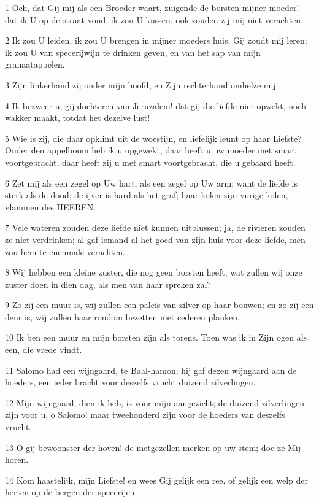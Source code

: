 \par 1 Och, dat Gij mij als een Broeder waart, zuigende de borsten mijner moeder! dat ik U op de straat vond, ik zou U kussen, ook zouden zij mij niet verachten.
\par 2 Ik zou U leiden, ik zou U brengen in mijner moeders huis, Gij zoudt mij leren; ik zou U van specerijwijn te drinken geven, en van het sap van mijn granaatappelen.
\par 3 Zijn linkerhand zij onder mijn hoofd, en Zijn rechterhand omhelze mij.
\par 4 Ik bezweer u, gij dochteren van Jeruzalem! dat gij die liefde niet opwekt, noch wakker maakt, totdat het dezelve lust!
\par 5 Wie is zij, die daar opklimt uit de woestijn, en liefelijk leunt op haar Liefste? Onder den appelboom heb ik u opgewekt, daar heeft u uw moeder met smart voortgebracht, daar heeft zij u met smart voortgebracht, die u gebaard heeft.
\par 6 Zet mij als een zegel op Uw hart, als een zegel op Uw arm; want de liefde is sterk als de dood; de ijver is hard als het graf; haar kolen zijn vurige kolen, vlammen des HEEREN.
\par 7 Vele wateren zouden deze liefde niet kunnen uitblussen; ja, de rivieren zouden ze niet verdrinken; al gaf iemand al het goed van zijn huis voor deze liefde, men zou hem te enenmale verachten.
\par 8 Wij hebben een kleine zuster, die nog geen borsten heeft; wat zullen wij onze zuster doen in dien dag, als men van haar spreken zal?
\par 9 Zo zij een muur is, wij zullen een paleis van zilver op haar bouwen; en zo zij een deur is, wij zullen haar rondom bezetten met cederen planken.
\par 10 Ik ben een muur en mijn borsten zijn als torens. Toen was ik in Zijn ogen als een, die vrede vindt.
\par 11 Salomo had een wijngaard, te Baal-hamon; hij gaf dezen wijngaard aan de hoeders, een ieder bracht voor deszelfs vrucht duizend zilverlingen.
\par 12 Mijn wijngaard, dien ik heb, is voor mijn aangezicht; de duizend zilverlingen zijn voor u, o Salomo! maar tweehonderd zijn voor de hoeders van deszelfs vrucht.
\par 13 O gij bewoonster der hoven! de metgezellen merken op uw stem; doe ze Mij horen.
\par 14 Kom haastelijk, mijn Liefste! en wees Gij gelijk een ree, of gelijk een welp der herten op de bergen der specerijen.



